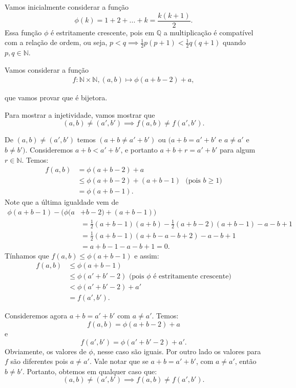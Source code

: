 \documentclass[../main.tex]{subfiles}
\begin{document}
\begin{dem}
    Vamos inicialmente considerar a função 
    \[\phi(k) = 1 + 2 + ... + k = \frac{k(k+1)}{2}.\]
    Essa função $\phi$ é estritamente crescente, pois em $\mathbb{Q}$ a multiplicação é compatível com a relação de ordem, ou seja, $p < q \implies \frac{1}{2} p (p+1) < \frac{1}{2} q (q+1)$ quando $p,q \in \mathbb{N}$.

    Vamos considerar a função 
    \begin{align*}
        f \colon \mathbb{N} \times \mathbb{N},
        (a,b) \mapsto \phi(a+b-2) + a,
    \end{align*}
    
    que vamos provar que é bijetora.
    
    Para mostrar a injetividade, vamos mostrar que 
    \[ (a,b) \neq (a',b') \implies f(a,b) \neq f(a',b'). \]

    De $(a,b) \neq (a',b')$ temos $(a+b \neq a'+b')$ ou $(a+b = a'+b'$ e $a \neq a' $ e $ b \neq b')$.
    Consideremos $a+b < a'+b'$, e portanto $a+b+r = a'+b'$ para algum $r \in \mathbb{N}$. Temos:
    \begin{align*}
        f(a,b) 
        &= \phi(a+b-2) + a \\
        &\leq \phi(a+b-2) + (a+b-1) \hspace{4pt} \text{ (pois $b \geq 1$)} \\
        &=  \phi(a+b-1).
    \end{align*}
    Note que a última igualdade vem de
    \begin{align*}
        \phi(a+b-1) - \big(  \phi(a&+b-2) + (a+b-1) \big) \\
        &= \frac{1}{2}(a+b-1)(a+b) - \frac{1}{2}(a+b-2)(a+b-1) - a - b + 1 \\
        &= \frac{1}{2}(a+b-1)(a+b -a-b+2) - a - b + 1 \\
        &= a+b-1-a-b+1 = 0.   
    \end{align*}
    Tínhamos que $f(a,b) \leq \phi(a+b-1)$ e assim: 
    \begin{align*}
        f(a,b) &\leq \phi(a+b-1) \\
        &\leq \phi(a' + b' -2) \text{ (pois $\phi$ é estritamente crescente)} \\
        &< \phi(a'+b' - 2) + a' \\
        &= f(a',b').
    \end{align*}

    \noindent
    Consideremos agora $a+b = a'+b'$ com $a \neq a'$. Temos:
    \[ f(a,b) = \phi(a+b-2) + a \]
    e
    \[ f(a',b') = \phi(a'+b'-2) + a'. \]
    Obviamente, os valores de $\phi$, nesse caso são iguais. Por outro lado os valores para $f$ são diferentes pois $a \neq a'$.
    Vale notar que se $a+b = a'+b'$, com $a \neq a'$, então $b \neq b'$. 
    Portanto, obtemos em qualquer caso que:
    \[ (a,b) \neq (a',b') \implies f(a,b) \neq f(a',b'). \]


\end{dem}
\end{document}
